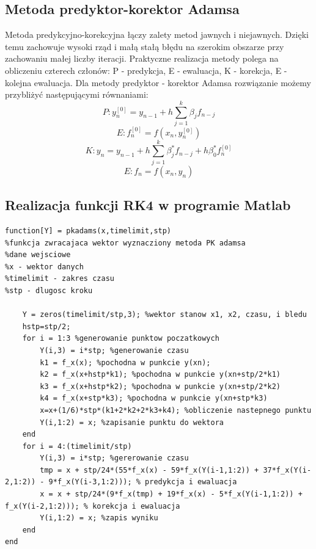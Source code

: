 \documentclass[a4paper, 11pt]{article}
\begin{document}
\subsection{Metoda predyktor-korektor Adamsa}
Metoda predykcyjno-korekcyjna łączy zalety metod jawnych i niejawnych. Dzięki temu zachowuje wysoki rząd i małą stałą błędu na szerokim obszarze przy zachowaniu małej liczby iteracji. Praktyczne realizacja metody polega na obliczeniu czterech członów: P - predykcja, E - ewaluacja, K - korekcja, E - kolejna ewaluacja. Dla metody predyktor - korektor Adamsa rozwiązanie możemy przybliżyć następującymi równaniami: 
$$P:  y_{n}^{[0]} = y_{n-1} + h \sum_{j=1}^{k} \beta_{j}f_{n-j}$$
$$E:  f_{n}^{[0]} = f(x_{n},y_{n}^{[0]})$$
$$K:  y_{n} = y_{n-1} + h \sum_{j=1}^{k} \beta_{j}^{*}f_{n-j}+h\beta_{0}^{*}f_{n}^{[0]}$$
$$E:  f_{n} = f(x_{n},y_{n})$$


\subsection{Realizacja funkcji RK4 w programie Matlab}
\begin{lstlisting}
function[Y] = pkadams(x,timelimit,stp)
%funkcja zwracajaca wektor wyznacziony metoda PK adamsa
%dane wejsciowe
%x - wektor danych 
%timelimit - zakres czasu
%stp - dlugosc kroku
   
    Y = zeros(timelimit/stp,3); %wektor stanow x1, x2, czasu, i bledu
    hstp=stp/2;
    for i = 1:3 %generowanie punktow poczatkowych
        Y(i,3) = i*stp; %generowanie czasu
        k1 = f_x(x); %pochodna w punkcie y(xn);
        k2 = f_x(x+hstp*k1); %pochodna w punkcie y(xn+stp/2*k1) 
        k3 = f_x(x+hstp*k2); %pochodna w punkcie y(xn+stp/2*k2)
        k4 = f_x(x+stp*k3); %pochodna w punkcie y(xn+stp*k3)
        x=x+(1/6)*stp*(k1+2*k2+2*k3+k4); %obliczenie nastepnego punktu
        Y(i,1:2) = x; %zapisanie punktu do wektora
    end
    for i = 4:(timelimit/stp)
        Y(i,3) = i*stp; %gererowanie czasu
        tmp = x + stp/24*(55*f_x(x) - 59*f_x(Y(i-1,1:2)) + 37*f_x(Y(i-2,1:2)) - 9*f_x(Y(i-3,1:2))); % predykcja i ewaluacja
        x = x + stp/24*(9*f_x(tmp) + 19*f_x(x) - 5*f_x(Y(i-1,1:2)) + f_x(Y(i-2,1:2))); % korekcja i ewaluacja
        Y(i,1:2) = x; %zapis wyniku
    end
end
\end{lstlisting}
\end{document}
